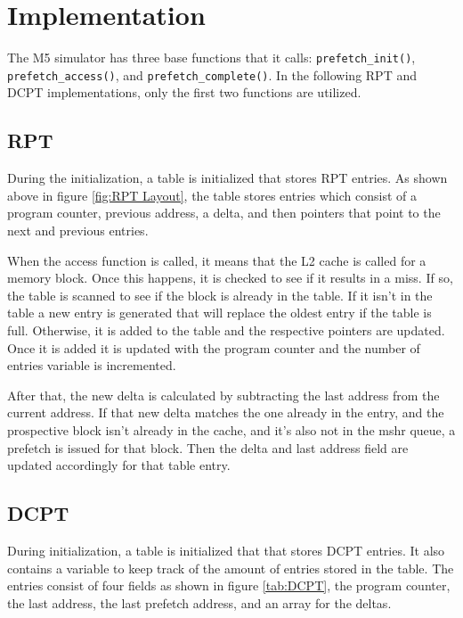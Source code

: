 \section{Implementation}\label{sec:implementation}
The M5 simulator has three base functions that it calls: \lstinline{prefetch_init()}, \lstinline{prefetch_access()}, and \lstinline{prefetch_complete()}. In the following RPT and DCPT implementations, only the first two functions are utilized. 

\subsection{RPT}
During the initialization, a table is initialized that stores RPT entries. As shown above in figure \ref{fig:RPT Layout}, the table stores entries which consist of a program counter, previous address, a delta, and then pointers that point to the next and previous entries.

When the access function is called, it means that the L2 cache is called for a memory block. Once this happens, it is checked to see if it results in a miss. If so, the table is scanned to see if the block is already in the table. If it isn't in the table a new entry is generated that will replace the oldest entry if the table is full. Otherwise, it is added to the table and the respective pointers are updated. Once it is added it is updated with the program counter and the number of entries variable is incremented. 

After that, the new delta is calculated by subtracting the last address from the current address. If that new delta matches the one already in the entry, and the prospective block isn't already in the cache, and it's also not in the mshr queue, a prefetch is issued for that block. Then the delta and last address field are updated accordingly for that table entry.

\subsection{DCPT}
During initialization, a table is initialized that that stores DCPT entries. It also contains a variable to keep track of the amount of entries stored in the table. The entries consist of four fields as shown in figure \ref{tab:DCPT}, the program counter, the last address, the last prefetch address, and an array for the deltas. 

